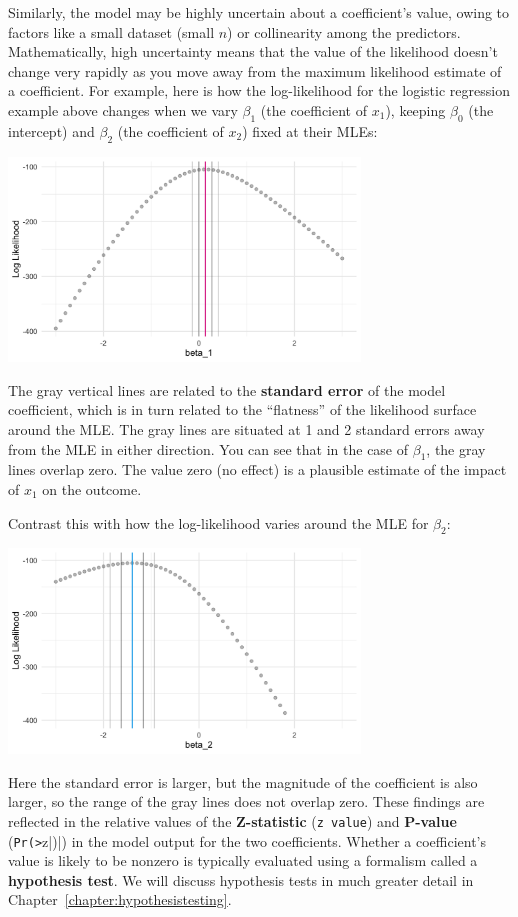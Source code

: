 Similarly, the model may be highly uncertain about a coefficient's value, owing to factors like a small dataset (small $n$) or collinearity among the predictors. Mathematically, high uncertainty means that the value of the likelihood doesn't change very rapidly as you move away from the maximum likelihood estimate of a coefficient. For example, here is how the log-likelihood for the logistic regression example above changes when we vary $\beta_1$ (the coefficient of $x_1$), keeping $\beta_0$ (the intercept) and $\beta_2$ (the coefficient of $x_2$) fixed at their MLEs: 
\begin{center}
\includegraphics[width=0.7\textwidth]{img/esl-logistic-beta1.png}
\end{center}
The gray vertical lines are related to the \textbf{standard error} of the model coefficient, which is in turn related to the ``flatness'' of the likelihood surface around the MLE. The gray lines are situated at 1 and 2 standard errors away from the MLE in either direction. You can see that in the case of $\beta_1$, the gray lines overlap zero. The value zero (no effect) is a plausible estimate of the impact of $x_1$ on the outcome. 

Contrast this with how the log-likelihood varies around the MLE for $\beta_2$:
\begin{center}
\includegraphics[width=0.7\textwidth]{img/esl-logistic-beta2.png}
\end{center}
Here the standard error is larger, but the magnitude of the coefficient is also larger, so the range of the gray lines does not overlap zero. These findings are reflected in the relative values of the \textbf{Z-statistic} (\texttt{z value}) and \textbf{P-value} (\verb|Pr(>|z|)|) in the model output for the two coefficients. Whether a coefficient's value is likely to be nonzero is typically evaluated using a formalism called a \textbf{hypothesis test}. We will discuss hypothesis tests in much greater detail in Chapter~\ref{chapter:hypothesistesting}.  

